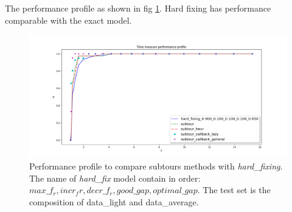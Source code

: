 The performance profile as shown in fig \ref{fig:Lsubtours_hardfixing_lightaverage_time}. Hard fixing has performance comparable with the exact model.

\begin{figure}[h]
	\centering
	\includegraphics[width=\columnwidth]{../res/Lsubtours_hardfixing_lightaverage_time.png}
	\caption{Performance profile to compare subtours methods with \textit{hard\_fixing}. The name of \textit{hard\_fix} model contain in order: $ max\_f_r, incr_fr, decr\_f_r, good\_gap, optimal\_gap $. The test set is the composition of data\_light and data\_average.}
	\label{fig:Lsubtours_hardfixing_lightaverage_time}
\end{figure}


